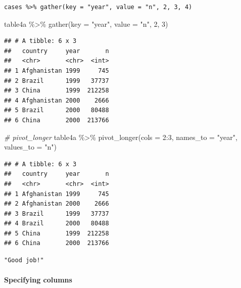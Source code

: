 \documentclass[
]{article}
\newenvironment{Shaded}{\begin{snugshade}}{\end{snugshade}}
\newcommand{\AttributeTok}[1]{\textcolor[rgb]{0.77,0.63,0.00}{#1}}
\newcommand{\CommentTok}[1]{\textcolor[rgb]{0.56,0.35,0.01}{\textit{#1}}}
\newcommand{\DecValTok}[1]{\textcolor[rgb]{0.00,0.00,0.81}{#1}}
\newcommand{\FunctionTok}[1]{\textcolor[rgb]{0.00,0.00,0.00}{#1}}
\newcommand{\NormalTok}[1]{#1}
\newcommand{\SpecialCharTok}[1]{\textcolor[rgb]{0.00,0.00,0.00}{#1}}
\newcommand{\StringTok}[1]{\textcolor[rgb]{0.31,0.60,0.02}{#1}}
\begin{document}
\begin{verbatim}
cases %>% gather(key = "year", value = "n", 2, 3, 4)
\end{verbatim}

\begin{Shaded}
\begin{Highlighting}[]
\NormalTok{table4a }\SpecialCharTok{\%\textgreater{}\%} \FunctionTok{gather}\NormalTok{(}\AttributeTok{key =} \StringTok{"year"}\NormalTok{, }\AttributeTok{value =} \StringTok{"n"}\NormalTok{, }\DecValTok{2}\NormalTok{, }\DecValTok{3}\NormalTok{)}
\end{Highlighting}
\end{Shaded}

\begin{verbatim}
## # A tibble: 6 x 3
##   country     year       n
##   <chr>       <chr>  <int>
## 1 Afghanistan 1999     745
## 2 Brazil      1999   37737
## 3 China       1999  212258
## 4 Afghanistan 2000    2666
## 5 Brazil      2000   80488
## 6 China       2000  213766
\end{verbatim}

\begin{Shaded}
\begin{Highlighting}[]
\CommentTok{\# pivot\_longer}
\NormalTok{table4a }\SpecialCharTok{\%\textgreater{}\%} \FunctionTok{pivot\_longer}\NormalTok{(}\AttributeTok{cols =} \DecValTok{2}\SpecialCharTok{:}\DecValTok{3}\NormalTok{, }\AttributeTok{names\_to =} \StringTok{"year"}\NormalTok{, }\AttributeTok{values\_to =} \StringTok{"n"}\NormalTok{)}
\end{Highlighting}
\end{Shaded}

\begin{verbatim}
## # A tibble: 6 x 3
##   country     year       n
##   <chr>       <chr>  <int>
## 1 Afghanistan 1999     745
## 2 Afghanistan 2000    2666
## 3 Brazil      1999   37737
## 4 Brazil      2000   80488
## 5 China       1999  212258
## 6 China       2000  213766
\end{verbatim}

\begin{verbatim}
"Good job!"
\end{verbatim}

\hypertarget{specifying-columns}{%
\paragraph{Specifying columns}\label{specifying-columns}}
\end{document}
